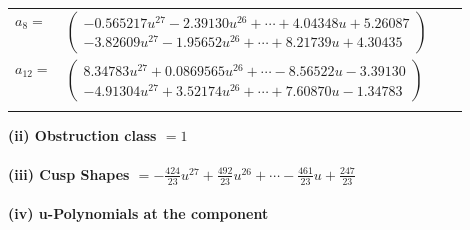 \documentclass[1p]{elsarticle_modified}
\theoremstyle{definition}
\begin{document}
\begin{tabular}{m{7pt} m{180pt} m{7pt} m{180pt} }
\flushright $a_{8}=$&$\begin{pmatrix}-0.565217 u^{27}-2.39130 u^{26}+\cdots+4.04348 u+5.26087\\-3.82609 u^{27}-1.95652 u^{26}+\cdots+8.21739 u+4.30435\end{pmatrix}$ \\
\flushright $a_{12}=$&$\begin{pmatrix}8.34783 u^{27}+0.0869565 u^{26}+\cdots-8.56522 u-3.39130\\-4.91304 u^{27}+3.52174 u^{26}+\cdots+7.60870 u-1.34783\end{pmatrix}$\\&\end{tabular}
\flushleft \textbf{(ii) Obstruction class $= 1$}\\~\\
\flushleft \textbf{(iii) Cusp Shapes $= -\frac{424}{23} u^{27}+\frac{492}{23} u^{26}+\cdots-\frac{461}{23} u+\frac{247}{23}$}\\~\\
\newpage\renewcommand{\arraystretch}{1}
\flushleft \textbf{(iv) u-Polynomials at the component}\newline \\
\end{document}

